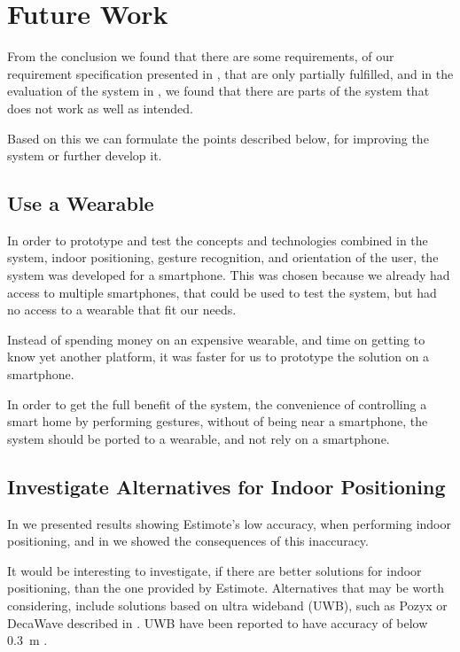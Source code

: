 \section{Future Work}\label{sec:conclusion:future-work}

From the conclusion we found that there are some requirements, 
of our requirement specification presented in , 
that are only partially fulfilled, 
and in the evaluation of the system in , 
we found that there are parts of the system that does not work as well as intended.

Based on this we can formulate the points described below, 
for improving the system or further develop it.

\subsection{Use a Wearable}

In order to prototype and test the concepts and technologies combined in the system, 
\eg indoor positioning, gesture recognition, and orientation of the user, 
the system was developed for a smartphone.
This was chosen because we already had access to multiple smartphones, 
that could be used to test the system, 
but had no access to a wearable that fit our needs.

Instead of spending money on an expensive wearable, 
and time on getting to know yet another platform, 
it was faster for us to prototype the solution on a smartphone.

In order to get the full benefit of the system, 
\ie the convenience of controlling a smart home by performing gestures, 
without of being near a smartphone, 
the system should be ported to a wearable, 
and not rely on a smartphone.

\subsection{Investigate Alternatives for Indoor Positioning}

In  we presented results showing Estimote's low accuracy, 
when performing indoor positioning, 
and in  we showed the consequences of this inaccuracy.

It would be interesting to investigate, 
if there are better solutions for indoor positioning, 
than the one provided by Estimote.
Alternatives that may be worth considering, 
include solutions based on ultra wideband (UWB), 
such as Pozyx or DecaWave described in .
UWB have been reported to have accuracy of below \SI{0.3}{\meter} \cite{Liu:4343996}.

